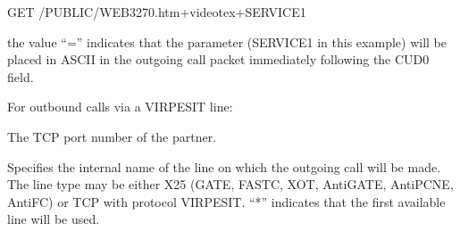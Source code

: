 \documentclass[letterpaper,10pt,english]{sphinxmanual}
\begin{document}
\begin{sphinxVerbatim}[commandchars=\\\{\}]
GET /PUBLIC/WEB3270.htm+videotex+SERVICE1

the value “=” indicates that the parameter (SERVICE1 in this example) will be placed in ASCII in the outgoing call packet immediately following the CUD0 field.

For outbound calls via a VIRPESIT line:

    The TCP port number of the partner.
\end{sphinxVerbatim}
\begin{description}
\sphinxAtStartPar
Specifies the internal name of the line on which the outgoing call will be made. The line type may be either X25 (GATE, FASTC, XOT, AntiGATE, AntiPCNE, AntiFC) or TCP with protocol VIRPESIT. “*” indicates that the first available line will be used.

\end{description}
\end{document}
